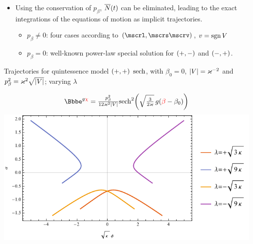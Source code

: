 \documentclass[8pt]{beamer}
\begin{document}
\begin{frame}
\begin{itemize}
\item Using the \alert{conservation of $p_\beta$}, ${\overline{N}}\mathopen{}\left(t\right)\mathclose{}$ can be eliminated, 
leading to the exact integrations of the equations of motion as \alert{implicit 
trajectories}.
\begin{itemize}
\item $p_\beta \neq 0$: four cases according to $\rbr{\mscrl, \mscrs \mscrv}$,
\textcolor{blue}{$v = \operatorname{sgn} V$}
\item $p_\beta = 0$: well-known power-law special solution for ${\left(+,-\right)}$ 
and ${\left(-,+\right)}$.
\end{itemize}

\end{itemize}
\end{frame}


\begin{frame}%
{Trajectories for quintessence model ${\left(+,+\right)}$}%
{$\operatorname{sech}$, with $\beta_0 = 0$, ${\left|V\right|} = \varkappa^{-2}$ and
$p_\beta^2 = \varkappa^2\sqrt{{\left|V\right|}}$; varying $\lambda$}

\begin{align}
\ee^{g\textcolor{red}{\chi}} = 
\tfrac{p_\beta^2}{12\varkappa^2\vbr{V}}
\rfun{\sech^2}{ \sqrt{\tfrac{3}{2\varkappa}}\,g 
\rbr{\textcolor{red}{\beta}-\beta_0}}
\end{align}
\includegraphics[width=\textwidth]{../plots.nb/sech_lamb.pdf}

\end{frame}
\end{document}
